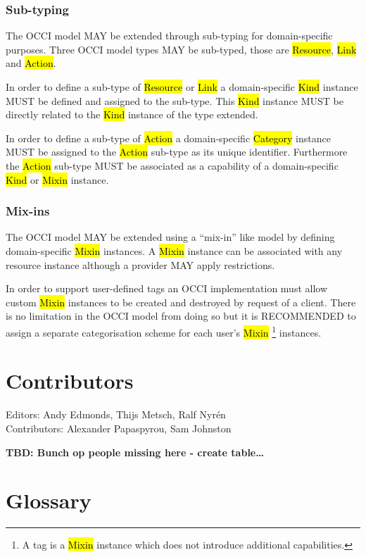 \documentclass[10pt,a4paper,british]{article}
\begin{document}
\subsubsection{Sub-typing}
The OCCI model MAY be extended through sub-typing for domain-specific purposes.
Three OCCI model types MAY be sub-typed, those are \hl{Resource}, \hl{Link} and
\hl{Action}.

In order to define a sub-type of \hl{Resource} or \hl{Link} a domain-specific
\hl{Kind} instance MUST be defined and assigned to the sub-type. This
\hl{Kind} instance MUST be directly related to the \hl{Kind} instance of the
type extended.

In order to define a sub-type of \hl{Action} a domain-specific \hl{Category}
instance MUST be assigned to the \hl{Action} sub-type as its unique identifier.
Furthermore the \hl{Action} sub-type MUST be associated as a capability of a
domain-specific \hl{Kind} or \hl{Mixin} instance.

\subsubsection{Mix-ins}
The OCCI model MAY be extended using a ``mix-in'' like model by defining
domain-specific \hl{Mixin} instances.  A \hl{Mixin} instance can be associated
with any resource instance although a provider MAY apply restrictions.

In order to support user-defined tags an OCCI implementation must allow custom
\hl{Mixin} instances to be created and destroyed by request of a client.
There is no limitation in the OCCI model from doing so but it is RECOMMENDED to
assign a separate categorisation scheme for each user's \hl{Mixin}%
\footnote{A tag is a \hl{Mixin} instance which does not introduce additional
capabilities.}
instances.

\section{Contributors}
Editors: Andy Edmonds, Thijs Metsch, Ralf Nyrén \\
Contributors: Alexander Papaspyrou, Sam Johnston

\textbf{TBD: Bunch op people missing here - create table\ldots}

\section{Glossary}
\label{sec:glossary}

\end{document}
